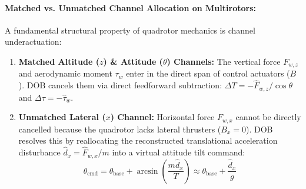 \documentclass[11pt,a4paper]{article}
\begin{document}
\paragraph{Matched vs. Unmatched Channel Allocation on Multirotors:}
A fundamental structural property of quadrotor mechanics is channel underactuation:
\begin{enumerate}[nosep]
  \item \textbf{Matched Altitude ($z$) \& Attitude ($\theta$) Channels:} The vertical force $F_{w,z}$ and aerodynamic moment $\tau_w$ enter in the direct span of control actuators ($B$). DOB cancels them via direct feedforward subtraction: $\Delta T = -\hat{F}_{w,z} / \cos\theta$ and $\Delta \tau = -\hat{\tau}_w$.
  \item \textbf{Unmatched Lateral ($x$) Channel:} Horizontal force $F_{w,x}$ cannot be directly cancelled because the quadrotor lacks lateral thrusters ($B_x = 0$). DOB resolves this by reallocating the reconstructed translational acceleration disturbance $\hat{d}_x = \hat{F}_{w,x}/m$ into a virtual attitude tilt command:
  \begin{equation}
  \theta_{\text{cmd}} = \theta_{\text{base}} + \arcsin\left(\frac{m \hat{d}_x}{T}\right) \approx \theta_{\text{base}} + \frac{\hat{d}_x}{g}
  \end{equation}
\end{enumerate}

\begin{table}[H]
\centering
\small
{}
\caption{Benchmark results for Experiment 34: Quadrotor disturbance observer wind rejection (from \texttt{experiments/34\_dob\_wind\_rejection/table.md}).}
\label{tab:exp34}
\end{table}
\end{document}
